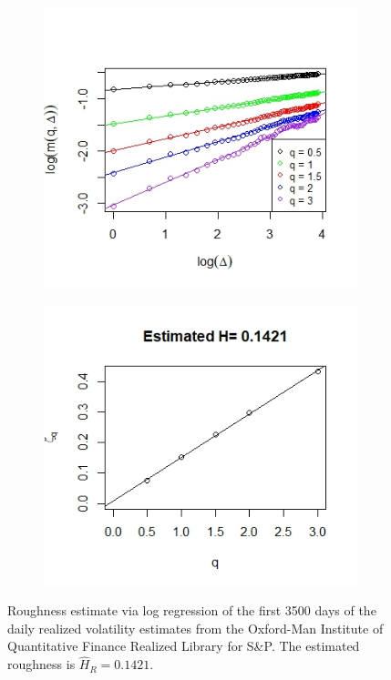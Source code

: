 \documentclass{article}
\begin{document}
\begin{figure}[htbp]
    \centering
    
    \begin{subfigure}{0.48\textwidth}
        \includegraphics[width=\linewidth]{volis1.jpeg}
    \end{subfigure}
    \hfill
    \begin{subfigure}{0.48\textwidth}
        \includegraphics[width=\linewidth]{volis2.jpeg}
    \end{subfigure}
    
    \caption{Roughness estimate via log regression of the first 3500 days of the daily realized volatility estimates from the Oxford-Man Institute of Quantitative Finance Realized Library for S\&P. The estimated roughness is $\widehat{H}_R=0.1421$. }
    \label{fig:oxfordlog}
\end{figure}\\\\
\end{document}
